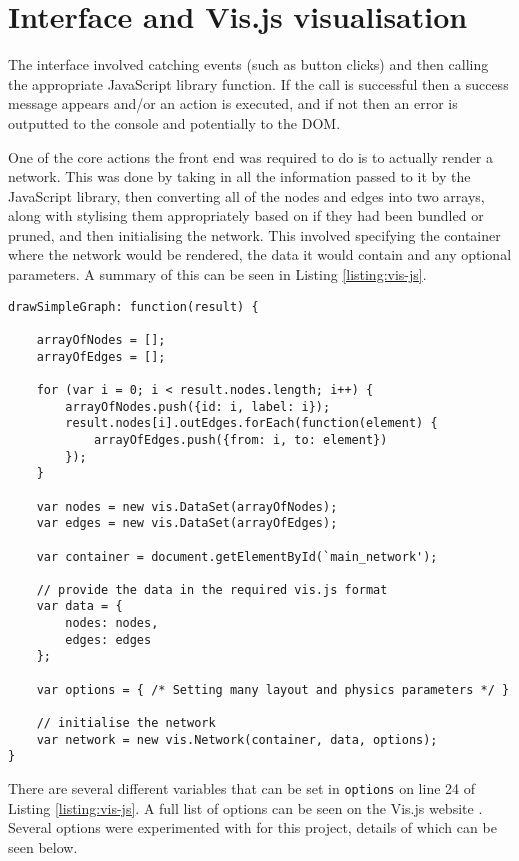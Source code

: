 \documentclass[../dissertation.tex]{subfiles}
\begin{document}
\section{Interface and Vis.js visualisation}
\label{sec:in-vis}

The interface involved catching events (such as button clicks) and then calling the appropriate JavaScript library function. If the call is successful then a success message appears and/or an action is executed, and if not then an error is outputted to the console and potentially to the DOM. 

One of the core actions the front end was required to do is to actually render a network. This was done by taking in all the information passed to it by the JavaScript library, then converting all of the nodes and edges into two arrays, along with stylising them appropriately based on if they had been bundled or pruned, and then initialising the network. This involved specifying the container where the network would be rendered, the data it would contain and any optional parameters. A summary of this can be seen in Listing \ref{listing:vis-js}.

\begin{lstlisting}[caption=How to create a network using Vis.js, label=listing:vis-js]
drawSimpleGraph: function(result) {

    arrayOfNodes = [];
    arrayOfEdges = [];
    
    for (var i = 0; i < result.nodes.length; i++) {
        arrayOfNodes.push({id: i, label: i});
        result.nodes[i].outEdges.forEach(function(element) {
            arrayOfEdges.push({from: i, to: element})
        });
    }
    
    var nodes = new vis.DataSet(arrayOfNodes);
    var edges = new vis.DataSet(arrayOfEdges);
    
    var container = document.getElementById(`main_network');
    
    // provide the data in the required vis.js format
    var data = {
        nodes: nodes,
        edges: edges
    };
    
    var options = { /* Setting many layout and physics parameters */ }
    
    // initialise the network
    var network = new vis.Network(container, data, options);
}
\end{lstlisting}

There are several different variables that can be set in \texttt{options} on line 24 of Listing \ref{listing:vis-js}. A full list of options can be seen on the Vis.js website \cite{visjsoptions}. Several options were experimented with for this project, details of which can be seen below. 
\end{document}
